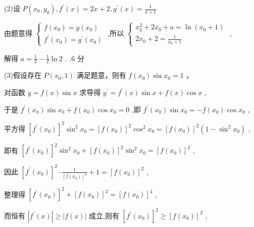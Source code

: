 \documentclass[10pt]{article}
\begin{document}
(2)设 \(P\left( {{x}_{0},{y}_{0}}\right) ,{f}^{\prime }\left( x\right)  = {2x} + 2,{g}^{\prime }\left( x\right)  = \frac{1}{x + 1}\)

由题意得 \(\left\{  \begin{array}{l} f\left( {x}_{0}\right)  = g\left( {x}_{0}\right) \\  {f}^{\prime }\left( {x}_{0}\right)  = {g}^{\prime }\left( {x}_{0}\right)  \end{array}\right.\) ,所以 \(\left\{  \begin{array}{l} {x}_{0}^{2} + 2{x}_{0} + a = \ln \left( {{x}_{0} + 1}\right) \\  2{x}_{0} + 2 = \frac{1}{{x}_{0} + 1} \end{array}\right.\) ,

解得 \(a = \frac{1}{2} - \frac{1}{2}\ln 2\) . .6 分

(3)假设存在 \(P\left( {{x}_{0},1}\right)\) 满足题意，则有 \(f\left( {x}_{0}\right) \sin {x}_{0} = 1\) ，

对函数 \(y = f\left( x\right) \sin x\) 求导得 \({y}^{\prime } = {f}^{\prime }\left( x\right) \sin x + f\left( x\right) \cos x\) ,

于是 \({f}^{\prime }\left( {x}_{0}\right) \sin {x}_{0} + f\left( {x}_{0}\right) \cos {x}_{0} = 0\) ,即 \({f}^{\prime }\left( {x}_{0}\right) \sin {x}_{0} =  - f\left( {x}_{0}\right) \cos {x}_{0}\) ,

平方得 \({\left\lbrack  {f}^{\prime }\left( {x}_{0}\right) \right\rbrack  }^{2}{\sin }^{2}{x}_{0} = {\left\lbrack  f\left( {x}_{0}\right) \right\rbrack  }^{2}{\cos }^{2}{x}_{0} = {\left\lbrack  f\left( {x}_{0}\right) \right\rbrack  }^{2}\left( {1 - {\sin }^{2}{x}_{0}}\right)\) ,

即有 \({\left\lbrack  {f}^{\prime }\left( {x}_{0}\right) \right\rbrack  }^{2}{\sin }^{2}{x}_{0} + {\left\lbrack  f\left( {x}_{0}\right) \right\rbrack  }^{2}{\sin }^{2}{x}_{0} = {\left\lbrack  f\left( {x}_{0}\right) \right\rbrack  }^{2}\) ,

因此 \({\left\lbrack  {f}^{\prime }\left( {x}_{0}\right) \right\rbrack  }^{2} \cdot  \frac{1}{{\left\lbrack  f\left( {x}_{0}\right) \right\rbrack  }^{2}} + 1 = {\left\lbrack  f\left( {x}_{0}\right) \right\rbrack  }^{2}\) ,

整理得 \({\left\lbrack  {f}^{\prime }\left( {x}_{0}\right) \right\rbrack  }^{2} + {\left\lbrack  f\left( {x}_{0}\right) \right\rbrack  }^{2} = {\left\lbrack  f\left( {x}_{0}\right) \right\rbrack  }^{4}\) ,

而恒有 \(\left| {{f}^{\prime }\left( x\right) }\right|  \geq  \left| {f\left( x\right) }\right|\) 成立,则有 \({\left\lbrack  {f}^{\prime }\left( {x}_{0}\right) \right\rbrack  }^{2} \geq  {\left\lbrack  f\left( {x}_{0}\right) \right\rbrack  }^{2}\) ,
\end{document}
